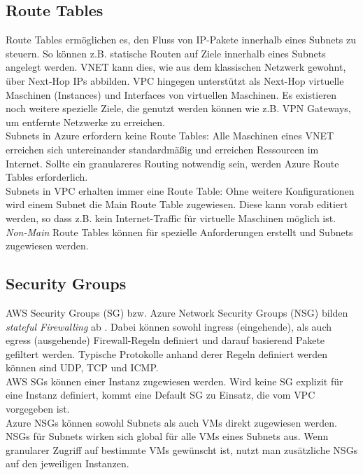 \subsection{Route Tables}
Route Tables ermöglichen es, den Fluss von IP-Pakete innerhalb eines Subnets zu steuern. So können z.B. statische Routen auf Ziele innerhalb eines Subnets angelegt werden. \gls{VNET} kann dies, wie aus dem klassischen Netzwerk gewohnt, über Next-Hop IPs abbilden. \gls{VPC} hingegen unterstützt als Next-Hop virtuelle Maschinen (Instances) und Interfaces von virtuellen Maschinen. Es existieren noch weitere spezielle Ziele, die genutzt werden können wie z.B. \gls{VPN} Gateways, um entfernte Netzwerke zu erreichen.\\
Subnets in Azure erfordern keine Route Tables: Alle Maschinen eines \gls{VNET} erreichen sich untereinander standardmäßig und erreichen Ressourcen im Internet. Sollte ein granulareres Routing notwendig sein, werden Azure Route Tables erforderlich.\\
Subnets in \gls{VPC} erhalten immer eine Route Table: Ohne weitere Konfigurationen wird einem Subnet die Main Route Table zugewiesen. Diese kann vorab editiert werden, so dass z.B. kein Internet-Traffic für virtuelle Maschinen möglich ist. \textit{Non-Main} Route Tables können für spezielle Anforderungen erstellt und Subnets zugewiesen werden.

\subsection{Security Groups}
AWS Security Groups (SG) bzw. Azure Network Security Groups (\gls{NSG}) bilden \textit{stateful Firewalling} ab \cite{wool2006packet}. Dabei können sowohl ingress (eingehende), als auch egress (ausgehende) Firewall-Regeln definiert und darauf basierend Pakete gefiltert werden. Typische Protokolle anhand derer Regeln definiert werden können sind \gls{UDP}, \gls{TCP} und \gls{ICMP}.\\
AWS \gls{SG}s können einer Instanz zugewiesen werden. Wird keine \gls{SG} explizit für eine Instanz definiert, kommt eine Default \gls{SG} zu Einsatz, die vom \gls{VPC} vorgegeben ist.\\
Azure \gls{NSG}s können sowohl Subnets als auch \gls{VM}s direkt zugewiesen werden. \gls{NSG}s für Subnets wirken sich global für alle \gls{VM}s eines Subnets aus. Wenn granularer Zugriff auf bestimmte \gls{VM}s gewünscht ist, nutzt man zusätzliche \gls{NSG}s \glqq auf\grqq{} den jeweiligen Instanzen.

